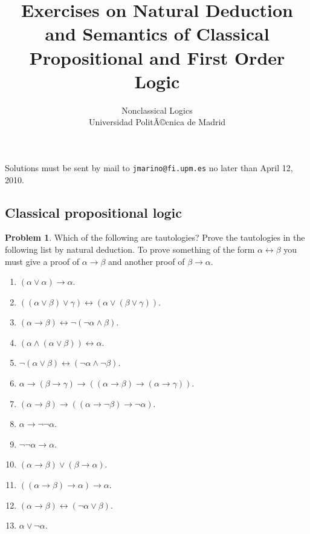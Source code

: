 \documentclass[a4paper]{article}
\theoremstyle{definition}
\newtheorem{prob}{Problem}
\begin{document}
\title{Exercises on Natural Deduction and Semantics of Classical Propositional 
       and First Order Logic}
\author{Nonclassical Logics\\
Universidad PolitÃ©cnica de Madrid}

\maketitle

\thispagestyle{empty}

%


\noindent
\begin{em}
Solutions must be sent by mail to \texttt{jmarino@fi.upm.es} no later
than April 12, 2010. 
\end{em}

\subsection*{Classical propositional logic}

\begin{prob}
Which of the following are tautologies? Prove the tautologies in the
following list by natural deduction. To prove something of the form
$\alpha \leftrightarrow \beta$ you must give a proof of 
$\alpha \rightarrow \beta$ and another proof of 
$\beta \rightarrow \alpha$.

\begin{enumerate}
\item $(\alpha \vee \alpha) \rightarrow \alpha$.
\item $((\alpha \vee \beta) \vee \gamma) \leftrightarrow 
       (\alpha \vee (\beta \vee \gamma))$.
\item $(\alpha \rightarrow \beta) \leftrightarrow 
       \neg(\neg\alpha \wedge \beta)$.
\item $(\alpha \wedge (\alpha \vee \beta)) \leftrightarrow \alpha$.
\item $\neg(\alpha \vee \beta) \leftrightarrow (\neg\alpha \wedge \neg\beta)$.
\item $\alpha \rightarrow (\beta \rightarrow \gamma) \rightarrow 
       ((\alpha \rightarrow \beta) \rightarrow (\alpha \rightarrow \gamma))$.
\item $(\alpha \rightarrow \beta) \rightarrow 
       ((\alpha \rightarrow \neg\beta) \rightarrow \neg\alpha)$.
\item $\alpha \rightarrow \neg\neg\alpha$.
\item $\neg\neg\alpha \rightarrow \alpha$.
\item $(\alpha \rightarrow \beta) \vee (\beta \rightarrow \alpha)$.
\item $((\alpha \rightarrow \beta) \rightarrow \alpha) \rightarrow
       \alpha$.
\item $(\alpha \rightarrow \beta) \leftrightarrow 
       (\neg\alpha \vee \beta)$.
\item $\alpha \vee \neg\alpha$.
\end{enumerate}
\end{prob}
\end{document}
